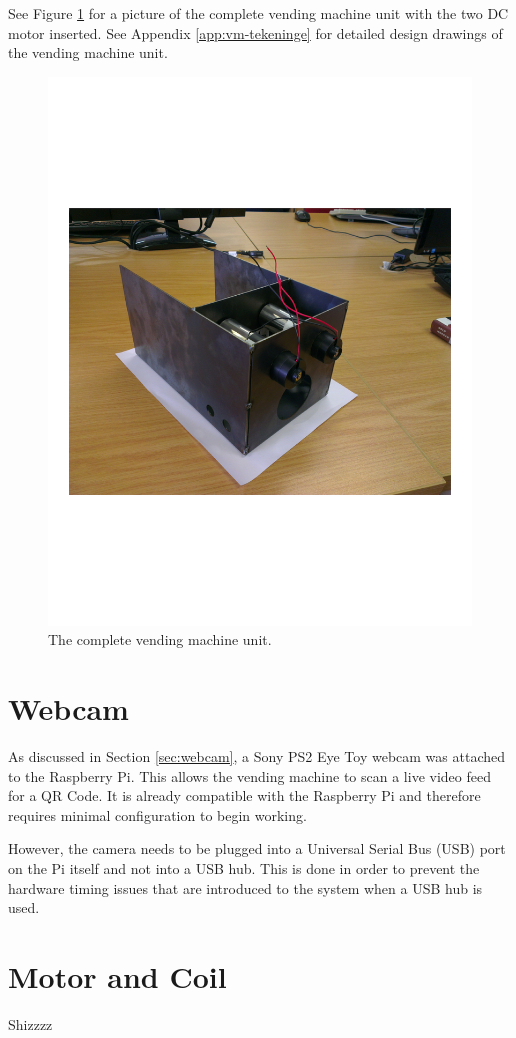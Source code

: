 See Figure \ref{fig:vm-actual} for a picture of the
complete vending machine unit with the two DC motor
inserted. See Appendix \ref{app:vm-tekeninge} for detailed
design drawings of the vending machine unit.

\begin{figure}
 \centering 
 \includegraphics[clip=true, trim = 80 150 150 200,
 scale=0.7]{complete_vm}
 \caption{The complete vending machine unit.}
 \label{fig:vm-actual}
\end{figure}

\section{Webcam}

As discussed in Section \ref{sec:webcam}, a Sony PS2 Eye Toy  webcam was
attached to the Raspberry Pi. This allows the vending machine to scan a live
video feed for a QR Code. It is already compatible with the Raspberry Pi and
therefore requires minimal configuration to begin working.

However, the camera needs to be plugged into a Universal Serial Bus (USB) port
on the Pi itself and not into a USB hub. This is done in order to prevent the
hardware timing issues that are introduced to the system when a USB hub is used. 

\section{Motor and Coil}

Shizzzz




